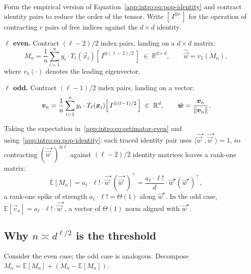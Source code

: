 Form the empirical version of Equation~\eqref{app:intro:eq:pop-identity} and contract identity pairs to reduce the order of the tensor. Write \([\,I^{\otimes r}\,]\) for the operation of contracting \(r\) pairs of free indices against the \(d \times d\) identity.

\medskip\noindent
\textbf{\(\ell\) even.} Contract \((\ell-2)/2\) index pairs, landing on a \(d\times d\) matrix:
\begin{equation}\label{app:intro:eq:estimator-even}
    M_n = \frac{1}{n}\sum_{i=1}^n y_i\cdot T_\ell(\vec{x}_i)\!\left[\,I^{\otimes(\ell-2)/2}\,\right] \;\in\; \mathbb{R}^{d\times d}, \qquad \hat{\vec{w}} = v_1(M_n),
\end{equation}
where \(v_1(\cdot)\) denotes the leading eigenvector.

\medskip\noindent
\textbf{\(\ell\) odd.} Contract \((\ell-1)/2\) index pairs, landing on a vector:
\begin{equation}\label{app:intro:eq:estimator-odd}
    {\boldsymbol{v}}_n = \frac{1}{n}\sum_{i=1}^n y_i\cdot T_\ell({\boldsymbol{x}}_i)\!\left[\,I^{\otimes(\ell-1)/2}\,\right] \;\in\; \mathbb{R}^d, \qquad \hat{{\boldsymbol{w}}} = \frac{{\boldsymbol{v}}_n}{\left\lVert {\boldsymbol{v}}_n\right\rVert}.
\end{equation}

\medskip
Taking the expectation in~\eqref{app:intro:eq:estimator-even} and using~\eqref{app:intro:eq:pop-identity}: each traced identity pair uses \(\langle\hat{\vec{w}}^\star,\hat{\vec{w}}^\star\rangle = 1\), so contracting \((\hat{\vec{w}}^\star)^{\otimes\ell}\) against \((\ell-2)/2\) identity matrices leaves a rank-one matrix:
\begin{equation}\label{app:intro:eq:pop-mean}
    \mathbb{E}[M_n] = a_\ell\cdot\ell!\cdot\hat{\vec{w}}^\star(\hat{\vec{w}}^\star)^\top
    = \frac{a_\ell\cdot\ell!}{d}\cdot\vec{w}^\star(\vec{w}^\star)^\top,
\end{equation}
a rank-one spike of strength \(a_\ell\cdot\ell! = \Theta(1)\) along \(\vec{w}^\star\). In the odd case, \(\mathbb{E}[\vec{v}_n] = a_\ell\cdot\ell!\cdot\hat{\vec{w}}^\star\), a vector of \(\Theta(1)\) norm aligned with \(\vec{w}^\star\).

\subsection{Why \texorpdfstring{\(n \asymp d^{\ell/2}\)}{n asymp d\textasciicircum(l/2)} is the threshold}

Consider the even case; the odd case is analogous. Decompose \(M_n = \mathbb{E}[M_n] + (M_n - \mathbb{E}[M_n])\).

